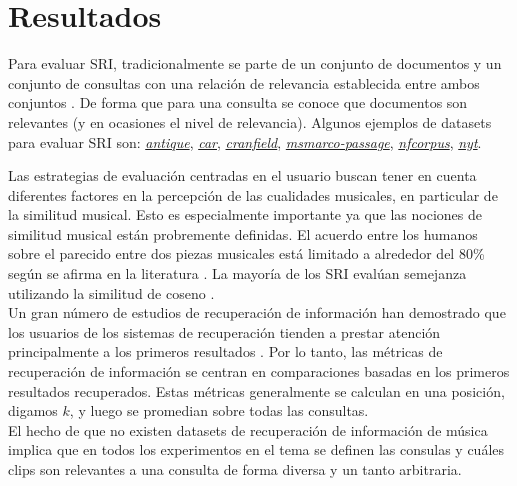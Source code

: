 \section{Resultados}
\label{sec:results}
Para evaluar SRI, tradicionalmente se parte de un conjunto de documentos y un conjunto de consultas con una relación de relevancia establecida entre ambos conjuntos \cite{manning2008introductiontoIR}. De forma que para una consulta se conoce que documentos son relevantes (y en ocasiones el nivel de relevancia). Algunos ejemplos de datasets para evaluar SRI son: \href{https://ir-datasets.com/antique.html}{\textit{antique}}, \href{https://ir-datasets.com/car.html}{\textit{car}}, \href{https://ir-datasets.com/cranfield.html}{\textit{cranfield}}, \href{https://ir-datasets.com/msmarco-passage.html}{\textit{msmarco-passage}}, \href{https://ir-datasets.com/nfcorpus.html}{\textit{nfcorpus}}, \href{https://ir-datasets.com/nyt.html}{\textit{nyt}}.

Las estrategias de evaluación centradas en el usuario buscan tener en cuenta diferentes factores en la percepción de las cualidades musicales, en particular de la similitud musical. Esto es especialmente importante ya que las nociones de similitud musical están probremente definidas. El acuerdo entre los humanos sobre el parecido entre dos piezas musicales está limitado a alrededor del 80\% según se afirma en la literatura \cite{Schedl2014MusicIR}.
La mayoría de los SRI evalúan semejanza utilizando la similitud de coseno \cite{Brundha2022VectorMB}.\\
Un gran número de estudios de recuperación de información han demostrado que los usuarios de los sistemas de recuperación tienden a prestar atención principalmente a los primeros resultados \cite{Mitra2017NeuralMF}. Por lo tanto, las métricas de recuperación de información se centran en comparaciones basadas en los primeros resultados recuperados. Estas métricas generalmente se calculan en una posición, digamos $k$, y luego se promedian sobre todas las consultas.\\

El hecho de que no existen datasets de recuperación de información de música implica que en todos los experimentos en el tema se definen las consulas y cuáles clips son relevantes a una consulta de forma diversa y un tanto arbitraria.

